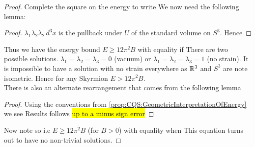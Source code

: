 \documentclass{article}
\begin{document}
\begin{proof}
Complete the square on the energy to write 
We now need the following lemma:
\begin{lemma}
\end{lemma}
\begin{proof}
$\lambda_1 \lambda_2 \lambda_2 \, d^3x$ is the pullback under $U$ of the standard volume on $S^3$. Hence 
\end{proof}
Thus we have the energy bound $E \geq 12\pi^2 B$ with equality if 
There are two possible solutions. $\lambda_1 = \lambda_2 = \lambda_3 = 0$ (vacuum) or $\lambda_1 = \lambda_2 = \lambda_3 = 1$ (no strain). It is impossible to have a solution with no strain everywhere as $\mathbb{R}^3$ and $S^3$ are note isometric. Hence for any Skyrmion $E > 12\pi^2 B$. \\
\newline
There is also an alternate rearrangement that comes from the following lemma 
\begin{lemma}
\end{lemma}
\begin{proof}
Using the conventions from \ref{prop:CQS:GeometricInterpretationOfEnergy} we see 
Results follows \hl{up to a minus sign error}
\end{proof}
Now note 
so 
i.e $E \geq 12 \pi^2 B$ (for $B>0$) with equality when 
This equation turns out to have no non-trivial solutions. 
\end{proof}
\end{document}
